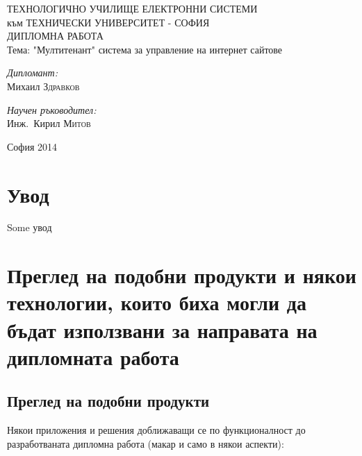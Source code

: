 \documentclass[pdftex,12pt,a4paper]{report}
\begin{document}
\setcounter{secnumdepth}{3}
\setcounter{tocdepth}{3}
\begin{titlepage}
	\begin{center}
		{\Huge ТЕХНОЛОГИЧНО УЧИЛИЩЕ ЕЛЕКТРОННИ СИСТЕМИ\\[0.5cm]} {\Large към ТЕХНИЧЕСКИ УНИВЕРСИТЕТ - СОФИЯ\\[3cm]}
		{\Huge ДИПЛОМНА РАБОТА\\[3cm]}
		Тема: "Мултитенант" система за управление на интернет сайтове\\[3cm]
		\begin{minipage}{0.4\textwidth}
			\begin{flushleft} \large
				\emph{Дипломант:}\\
				Михаил \textsc{Здравков}
			\end{flushleft}
		\end{minipage}
		\begin{minipage}{0.4\textwidth}
			\begin{flushright} \large
				\emph{Научен ръководител:} \\
				Инж.~Кирил \textsc{Митов}
			\end{flushright}
		\end{minipage}

		\vfill

		{\large София 2014}

	\end{center}
\end{titlepage}
\tableofcontents
\pagebreak
{}
\chapter*{Увод}
Some увод
\chapter {Преглед на подобни продукти и някои технологии, които биха могли да бъдат използвани за направата на дипломната работа}
\section {Преглед на подобни продукти}
Някои приложения и решения доближаващи се по функционалност до разработваната дипломна работа (макар и само в някои аспекти):
\end{document}
